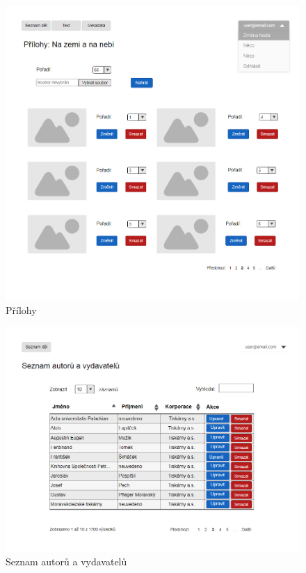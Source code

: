 \documentclass[thesis=B,czech]{FITthesis}[2012/06/26]
\begin{document}
    \begin {figure}[H]\centering
        \includegraphics[width=\textwidth]{images/attachments}
        \caption {Přílohy}
        \label {fig:attachments}
    \end{figure}

    \begin {figure}[H]\centering
        \includegraphics[width=\textwidth]{images/authPub}
        \caption {Seznam autorů a vydavatelů}
        \label {fig:authPub}
    \end{figure}
    
\end{document}
